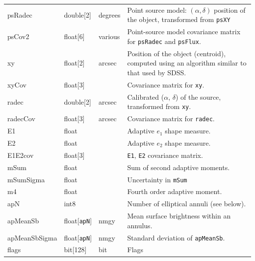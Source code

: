 \documentclass[12pt]{article}
\begin{document}
\begin{center}
\begin{longtable}{p{3cm}p{2cm}p{2cm}p{5cm}}
psRadec & double[2] & degrees & Point source model: $(\alpha, \delta)$ position of the object, transformed from {\tt psXY} \\

psCov2 & float[6] & various & Point-source model covariance matrix for {\tt psRadec} and {\tt psFlux}.\\ 


xy & float[2] & arcsec & Position of the object (centroid), computed using an algorithm similar to that used by SDSS.\\

xyCov & float[3] & ~ & Covariance matrix for {\tt xy}. \\

radec & double[2] & arcsec & Calibrated ($\alpha$, $\delta$) of the source, transformed from {\tt xy}.\\

radecCov & float[3] & arcsec & Covariance matrix for {\tt radec}. \\


E1 & float & ~ & Adaptive $e_1$ shape measure. \\

E2 & float & ~ & Adaptive $e_2$ shape measure. \\

E1E2cov & float[3] & ~ & {\tt E1}, {\tt E2} covariance matrix. \\

mSum & float & ~ & Sum of second adaptive moments. \\

mSumSigma & float & ~ & Uncertainty in {\tt mSum} \\

m4 & float & ~ & Fourth order adaptive moment. \\



apN & int8 & ~ & Number of elliptical annuli (see below). \\

apMeanSb & float[{\tt apN}] & nmgy & Mean surface brightness within an annulus. \\

apMeanSbSigma & float[{\tt apN}] & nmgy & Standard deviation of {\tt apMeanSb}. \\


flags & bit[128] & bit & Flags \\ \hline
\end{longtable}
\end{center}
\end{document}
